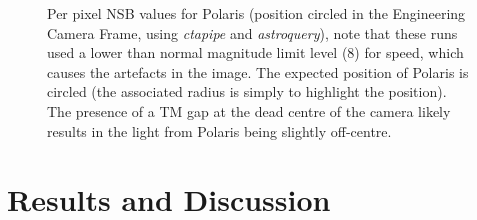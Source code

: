 \begin{figure}[ht!]
\begin{centering}
\caption{Per pixel NSB values for Polaris (position circled in the Engineering Camera Frame, using \textit{ctapipe} and \textit{astroquery}), note that these runs used a lower than normal magnitude limit level (8) for speed, which causes the artefacts in the image. The expected position of Polaris is circled (the associated radius is simply to highlight the position). The presence of a TM gap at the dead centre of the camera likely results in the light from Polaris being slightly off-centre.}
\label{fig:polaris}
\end{centering}
\end{figure} 

\section{Results and Discussion}
